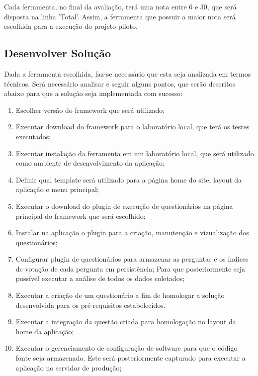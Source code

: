 Cada ferramenta, no final da avaliação, terá uma nota entre 6 e 30, que será disposta na linha 'Total'. Assim, a ferramenta que possuir a maior nota será escolhida para a execução do projeto piloto.

\subsection{Desenvolver Solução}
\label{sub:definir_tecnologia}

Dada a ferramenta escolhida, faz-se necessário que esta seja analizada em termos técnicos. Será necessário analisar e seguir alguns pontos, que
serão descritos abaixo para que a solução seja implementada com sucesso:

\begin{enumerate}
    \item Escolher versão do framework que será utilizado;
    \item Executar download do framework para o laboratório local, que terá os testes executados;
    \item Executar instalação da ferramenta em um laboratório local, que será utilizado como ambiente de
        desenvolvimento da aplicação;
    \item Definir qual template será utilizado para a página home do site, layout da aplicação e menu principal;
    \item Executar o download do plugin de execução de questionários na página principal do framework que será escolhido;
    \item Instalar na aplicação o plugin para a criação, manutenção e vizualização dos questionários;
    \item Configurar plugin de questionários para armazenar as perguntas e os índices de votação de cada pergunta em persistência;
        Para que posteriormente seja possível executar a análise de todos os dados coletados;
    \item Executar a criação de um questionário a fim de homologar a solução desenvolvida para os pré-requisitos estabelecidos. 
    \item Executar a integração da questão criada para homologação no layout da home da aplicação;
    \item Executar o gerenciamento de configuração de software para que o código fonte seja armazenado. Este será posteriormente
        capturado para executar a aplicação no servidor de produção;
\end{enumerate}

